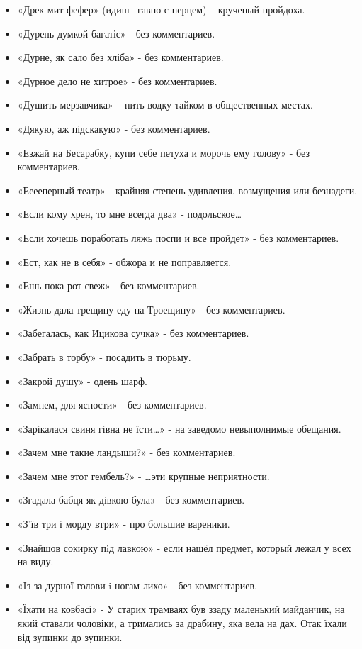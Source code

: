 \begin{itemize}
\item  «Дрек мит фефер» (идиш– гавно с перцем) – крученый пройдоха. 
\item  «Дурень думкой багатіє» - без комментариев.
\item  «Дурне, як сало без хліба» - без комментариев.
\item  «Дурное дело не хитрое» - без комментариев.
\item  «Душить мерзавчика» – пить водку тайком в общественных местах.
\item  «Дякую, аж підскакую» - без комментариев.
\item  «Езжай на Бесарабку, купи себе петуха и морочь ему голову» - без комментариев.
\item  «Ееееперный театр» - крайняя степень удивления, возмущения или безнадеги.
\item  «Если кому хрен, то мне всегда два» - подольское…
\item  «Если хочешь поработать ляжь поспи и все пройдет» - без комментариев.
\item  «Ест, как не в себя» - обжора и не поправляется.
\item  «Ешь пока рот свеж» - без комментариев.
\item  «Жизнь дала трещину еду на Троещину» - без комментариев.
\item  «Забегалась, как Ицикова сучка» - без комментариев.
\item  «Забрать в торбу» -  посадить в тюрьму.
\item  «Закрой душу» - одень шарф.
\item  «Замнем, для ясности» - без комментариев.
\item  «Зарікалася свиня гівна не їсти…» - на заведомо невыполнимые обещания.
\item  «Зачем мне такие ландыши?» - без комментариев.
\item  «Зачем мне этот гембель?» - …эти крупные неприятности.
\item  «Згадала бабця як дівкою була» - без комментариев.
\item  «З'їв три і морду втри» - про большие вареники.
\item  «Знайшов сокирку пiд лавкою» - если нашёл предмет, который лежал у всех на виду.
\item  «Iз-за дурної голови i ногам лихо» - без комментариев.
\item  «Їхати на ковбасі» - У старих трамваях був ззаду маленький майданчик, на який ставали чоловіки, а тримались за драбину, яка вела на дах. Отак їхали від зупинки до зупинки.

\end{itemize}
